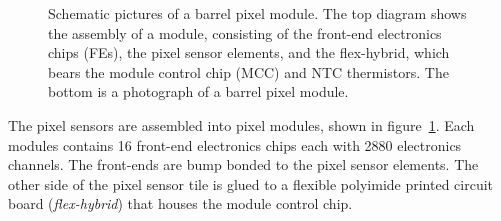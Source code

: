  \begin{figure}[htbp]
 	\centering
 	\caption{Schematic pictures of a barrel pixel module. The top diagram shows the assembly of a module, consisting of the front-end electronics chips (FEs), the pixel sensor elements, and the flex-hybrid, which bears the module control chip (MCC) and NTC thermistors. The bottom is a photograph of a barrel pixel module.}
 	\label{fig:ATLAS-pixel-module}
 \end{figure}

The pixel sensors are assembled into pixel modules, shown in figure~\ref{fig:ATLAS-pixel-module}. Each modules contains 16 front-end electronics chips each with 2880 electronics channels. The front-ends are bump bonded to the pixel sensor elements. The other side of the pixel sensor tile is glued to a flexible polyimide printed circuit board (\emph{flex-hybrid}) that houses the module control chip.


